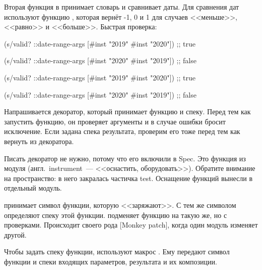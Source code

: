 \fi


Вторая функция в  принимает словарь и сравнивает даты. Для сравнения
дат используют функцию , которая вернёт \mbox{-1}, 0 и 1 для
случаев <<меньше>>, <<равно>> и <<больше>>. Быстрая проверка:

\ifnarrow


\begin{clojure}
(s/valid? ::date-range-args
          [#inst "2019" #inst "2020"])
;; true

(s/valid? ::date-range-args
          [#inst "2020" #inst "2019"])
;; false
\end{clojure}


\else


\begin{clojure}
(s/valid? ::date-range-args
          [#inst "2019" #inst "2020"]) ;; true

(s/valid? ::date-range-args
          [#inst "2020" #inst "2019"]) ;; false
\end{clojure}


\fi


Напрашивается декоратор, который принимает функцию и спеку. Перед тем как
запустить функцию, он проверяет аргументы и в случае ошибки бросит исключение.
Если задана спека результата, проверим его тоже перед тем как вернуть из
декоратора.


Писать декоратор не нужно, потому что его включили в Spec. Это функция
 из модуля 
(англ.~instru\-ment~--- <<оснастить, оборудовать>>). Обратите внимание на
пространство: в него закралась частичка test. Оснащение функций вынесли в
отдельный модуль.


 принимает символ функции, которую <<заряжают>>. С тем же
символом определяют спеку этой функции.  подменяет функцию на
такую же, но с проверками. Происходит своего рода [Monkey patch], когда
один модуль изменяет другой.

Чтобы задать спеку функции, используют макрос . Ему передают символ
функции и спеки входящих параметров, результата и их композиции.


